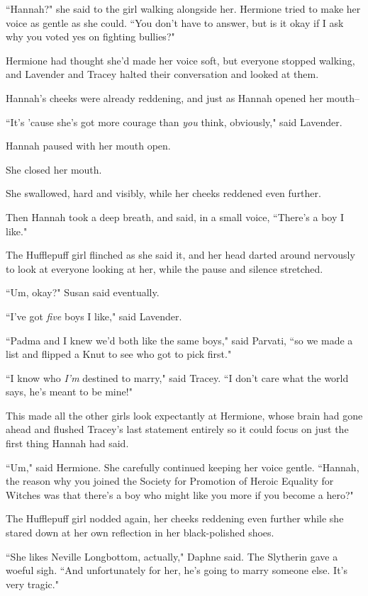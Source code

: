 ``Hannah?" she said to the girl walking alongside her. Hermione tried to make her voice as gentle as she could. ``You don't have to answer, but is it okay if I ask why you voted yes on fighting bullies?"

Hermione had thought she'd made her voice soft, but everyone stopped walking, and Lavender and Tracey halted their conversation and looked at them.

Hannah's cheeks were already reddening, and just as Hannah opened her mouth\---

``It's 'cause she's got more courage than \emph{you} think, obviously," said Lavender.

Hannah paused with her mouth open.

She closed her mouth.

She swallowed, hard and visibly, while her cheeks reddened even further.

Then Hannah took a deep breath, and said, in a small voice, ``There's a boy I like."

The Hufflepuff girl flinched as she said it, and her head darted around nervously to look at everyone looking at her, while the pause and silence stretched.

``Um, okay?" Susan said eventually.

``I've got \emph{five} boys I like," said Lavender.

``Padma and I knew we'd both like the same boys," said Parvati, ``so we made a list and flipped a Knut to see who got to pick first."

``I know who \emph{I'm} destined to marry," said Tracey. ``I don't care what the world says, he's meant to be mine!"

This made all the other girls look expectantly at Hermione, whose brain had gone ahead and flushed Tracey's last statement entirely so it could focus on just the first thing Hannah had said.

``Um," said Hermione. She carefully continued keeping her voice gentle. ``Hannah, the reason why you joined the Society for Promotion of Heroic Equality for Witches was that there's a boy who might like you more if you become a hero?"

The Hufflepuff girl nodded again, her cheeks reddening even further while she stared down at her own reflection in her black-polished shoes.

``She likes Neville Longbottom, actually," Daphne said. The Slytherin gave a woeful sigh. ``And unfortunately for her, he's going to marry someone else. It's very tragic."


